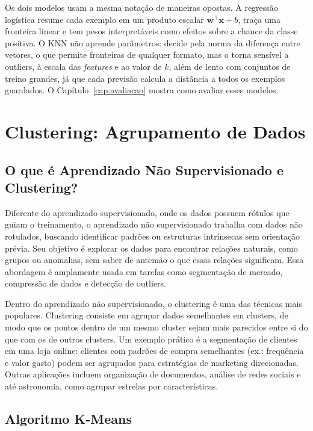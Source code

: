 \documentclass[a4paper,12pt,openany]{book}
\begin{document}
Os dois modelos usam a mesma notação de maneiras opostas. A regressão logística resume cada exemplo em um produto escalar \(\mathbf{w}^\top\mathbf{x} + b\), traça uma fronteira linear e tem pesos interpretáveis como efeitos sobre a chance da classe positiva. O KNN não aprende parâmetros: decide pela norma da diferença entre vetores, o que permite fronteiras de qualquer formato, mas o torna sensível a outliers, à escala das \textit{features} e ao valor de \(k\), além de lento com conjuntos de treino grandes, já que cada previsão calcula a distância a todos os exemplos guardados. O Capítulo~\ref{cap:avaliacao} mostra como avaliar esses modelos.

\chapter{Clustering: Agrupamento de Dados}

\section{O que é Aprendizado Não Supervisionado e Clustering?}

Diferente do aprendizado supervisionado, onde os dados possuem rótulos que guiam o treinamento, o aprendizado não supervisionado trabalha com dados não rotulados, buscando identificar padrões ou estruturas intrínsecas sem orientação prévia. Seu objetivo é explorar os dados para encontrar relações naturais, como grupos ou anomalias, sem saber de antemão o que essas relações significam. Essa abordagem é amplamente usada em tarefas como segmentação de mercado, compressão de dados e detecção de outliers.

Dentro do aprendizado não supervisionado, o clustering é uma das técnicas mais populares. Clustering consiste em agrupar dados semelhantes em clusters, de modo que os pontos dentro de um mesmo cluster sejam mais parecidos entre si do que com os de outros clusters. Um exemplo prático é a segmentação de clientes em uma loja online: clientes com padrões de compra semelhantes (ex.: frequência e valor gasto) podem ser agrupados para estratégias de marketing direcionadas. Outras aplicações incluem organização de documentos, análise de redes sociais e até astronomia, como agrupar estrelas por características.

\section{Algoritmo K-Means}
\end{document}
